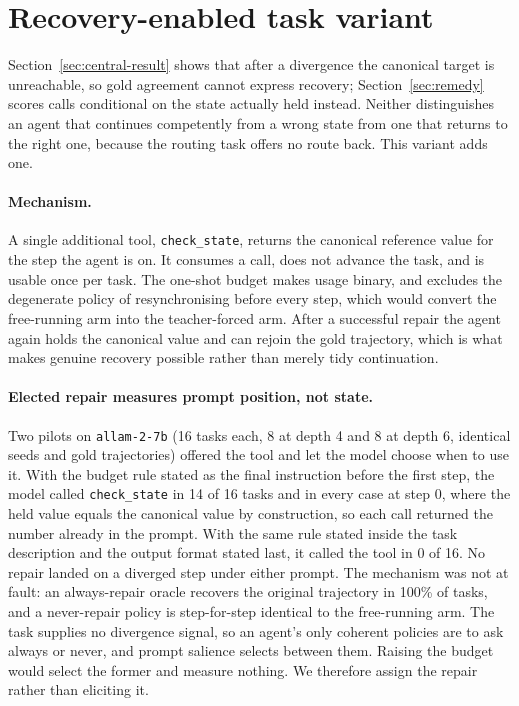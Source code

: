 \documentclass{article}
\begin{document}
\section{Recovery-enabled task variant}
\label{app:repair}

Section~\ref{sec:central-result} shows that after a divergence the canonical target is
unreachable, so gold agreement cannot express recovery; Section~\ref{sec:remedy} scores
calls conditional on the state actually held instead. Neither distinguishes an agent that
continues competently from a wrong state from one that returns to the right one, because
the routing task offers no route back. This variant adds one.

\paragraph{Mechanism.} A single additional tool, \texttt{check\_state}, returns the
canonical reference value for the step the agent is on. It consumes a call, does not
advance the task, and is usable once per task. The one-shot budget makes usage binary, and
excludes the degenerate policy of resynchronising before every step, which would convert
the free-running arm into the teacher-forced arm. After a successful repair the agent again
holds the canonical value and can rejoin the gold trajectory, which is what makes genuine
recovery possible rather than merely tidy continuation.

\paragraph{Elected repair measures prompt position, not state.} Two pilots on
\texttt{allam-2-7b} (16 tasks each, 8 at depth 4 and 8 at depth 6, identical seeds and gold
trajectories) offered the tool and let the model choose when to use it. With the budget
rule stated as the final instruction before the first step, the model called
\texttt{check\_state} in 14 of 16 tasks and in every case at step 0, where the held value
equals the canonical value by construction, so each call returned the number already in the
prompt. With the same rule stated inside the task description and the output format stated
last, it called the tool in 0 of 16. No repair landed on a diverged step under either
prompt. The mechanism was not at fault: an always-repair oracle recovers the original
trajectory in 100\% of tasks, and a never-repair policy is step-for-step identical to the
free-running arm. The task supplies no divergence signal, so an agent's only coherent
policies are to ask always or never, and prompt salience selects between them. Raising the
budget would select the former and measure nothing. We therefore assign the repair rather
than eliciting it.
\end{document}
